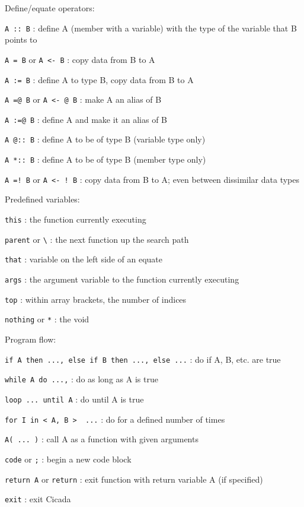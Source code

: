 \documentclass{article}
\begin{document}
\noindent
Define/equate operators:
\begin{description}
\item{\verb#A :: B#} :  define A (member with a variable) with the type of the variable that B points to
\item{\verb#A = B#  or  \verb#A <- B#} :  copy data from B to A
\item{\verb#A := B#} :  define A to type B, copy data from B to A
\item{\verb#A =@ B#  or  \verb#A <- @ B#} :  make A an alias of B
\item{\verb#A :=@ B#} :  define A and make it an alias of B
\item{\verb#A @:: B#} :  define A to be of type B (variable type only)
\item{\verb#A *:: B#} :  define A to be of type B (member type only)
\item{\verb#A =! B#  or  \verb#A <- ! B#} :  copy data from B to A; even between dissimilar data types\\
\end{description}

\noindent
Predefined variables:
\begin{description}
\item{\verb#this#} :  the function currently executing
\item{\verb#parent#  or  \verb#\#} :  the next function up the search path
\item{\verb#that#} :  variable on the left side of an equate
\item{\verb#args#} :  the argument variable to the function currently executing
\item{\verb#top#} :  within array brackets, the number of indices
\item{\verb#nothing#  or  \verb#*#} :  the void\\
\end{description}

\noindent
Program flow:
\begin{description}
\item{\verb#if A then ..., else if B then ..., else ...#} :  do if A, B, etc. are true
\item{\verb#while A do ...,#} :  do as long as A is true
\item{\verb#loop ... until A#} :  do until A is true
\item{\verb#for I in < A, B >  ...#} :  do for a defined number of times
\item{\verb#A( ... )#} :  call A as a function with given arguments
\item{\verb#code#} or \verb#;# :  begin a new code block
\item{\verb#return A#  or  \verb#return#} :  exit function with return variable A (if specified)
\item{\verb#exit#} :  exit Cicada\\
\end{description}
\end{document}

